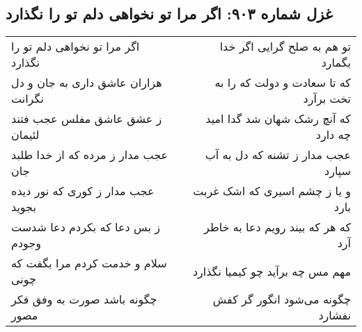 \begin{center}
\section*{غزل شماره ۹۰۳: اگر مرا تو نخواهی دلم تو را نگذارد}
\label{sec:0903}
\begin{longtable}{l p{0.5cm} r}
اگر مرا تو نخواهی دلم تو را نگذارد
&&
تو هم به صلح گرایی اگر خدا بگمارد
\\
هزاران عاشق داری به جان و دل نگرانت
&&
که تا سعادت و دولت که را به تخت برآرد
\\
ز عشق عاشق مفلس عجب فتند لئیمان
&&
که آنچ رشک شهان شد گدا امید چه دارد
\\
عجب مدار ز مرده که از خدا طلبد جان
&&
عجب مدار ز تشنه که دل به آب سپارد
\\
عجب مدار ز کوری که نور دیده بجوید
&&
و یا ز چشم اسیری که اشک غربت بارد
\\
ز بس دعا که بکردم دعا شدست وجودم
&&
که هر که بیند رویم دعا به خاطر آرد
\\
سلام و خدمت کردم مرا بگفت که چونی
&&
مهم مس چه برآید چو کیمیا نگذارد
\\
چگونه باشد صورت به وفق فکر مصور
&&
چگونه می‌شود انگور گر کفش نفشارد
\\
\end{longtable}
\end{center}
